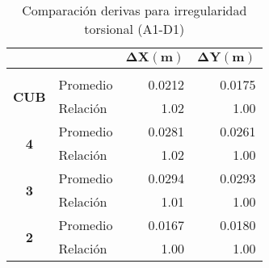 \documentclass[12pt]{article}
\begin{document}
\begin{table}[H]
  \centering
    \begin{tabular}{|c|l|r|r|}
\cline{3-4}    \multicolumn{1}{r}{} &     & \multicolumn{1}{c|}{\cellcolor[rgb]{ .2,  .247,  .31}\textcolor[rgb]{ 1,  1,  1}{\textbf{$\mathbf{\Delta X (m)}$}}} & \multicolumn{1}{c|}{\cellcolor[rgb]{ .2,  .247,  .31}\textcolor[rgb]{ 1,  1,  1}{\textbf{$\mathbf{\Delta Y (m)}$}}} \bigstrut\\
    \hline
    \rowcolor[rgb]{ .2,  .247,  .31} \multicolumn{4}{|c|}{\textcolor[rgb]{ 1,  1,  1}{\textbf{A1-D1}}} \bigstrut\\
    \hline
    \multirow{2}[4]{*}{\textbf{CUB}} & Promedio & 0.0212 & 0.0175 \bigstrut\\
\cline{2-4}        & Relación & 1.02 & 1.00 \bigstrut\\
    \hline
    \multirow{2}[4]{*}{\textbf{4}} & Promedio & 0.0281 & 0.0261 \bigstrut\\
\cline{2-4}        & Relación & 1.02 & 1.00 \bigstrut\\
    \hline
    \multirow{2}[4]{*}{\textbf{3}} & Promedio & 0.0294 & 0.0293 \bigstrut\\
\cline{2-4}        & Relación & 1.01 & 1.00 \bigstrut\\
    \hline
    \multirow{2}[4]{*}{\textbf{2}} & Promedio & 0.0167 & 0.0180 \bigstrut\\
\cline{2-4}        & Relación & 1.00 & 1.00 \bigstrut\\
    \hline
    \end{tabular}%

    \caption{Comparación derivas para irregularidad torsional (A1-D1)}
  \label{tab:A1-D1}%
\end{table}%
\end{document}
